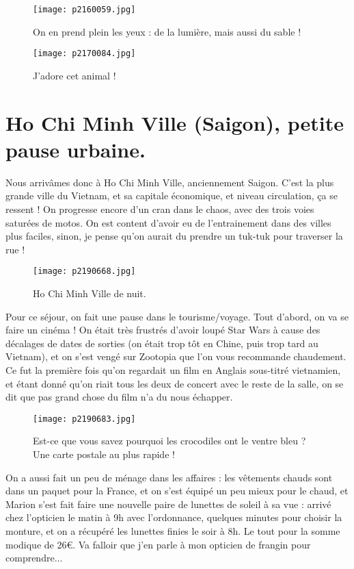 \documentclass{book}
\begin{document}
\begin{figure}[h]
\centering
\texttt{[image: p2160059.jpg]}
\caption*{On en prend plein les yeux : de la lumière, mais aussi du sable !}
\end{figure}


\begin{figure}[h]
\centering
\texttt{[image: p2170084.jpg]}
\caption*{J'adore cet animal !}
\end{figure}



\chapter{Ho Chi Minh Ville (Saigon), petite pause urbaine.}
Nous arrivâmes donc à Ho Chi Minh Ville, anciennement Saigon. C'est la plus grande ville du Vietnam, et sa capitale économique, et niveau circulation, ça se ressent ! On progresse encore d'un cran dans le chaos, avec des trois voies saturées de motos. On est content d'avoir eu de l'entrainement dans des villes plus faciles, sinon, je pense qu'on aurait du prendre un tuk-tuk pour traverser la rue !


\begin{figure}[h]
\centering
\texttt{[image: p2190668.jpg]}
\caption*{Ho Chi Minh Ville de nuit.}
\end{figure}

Pour ce séjour, on fait une pause dans le tourisme/voyage. Tout d'abord, on va se faire un cinéma ! On était très frustrés d'avoir loupé Star Wars à cause des décalages de dates de sorties (on était trop tôt en Chine, puis trop tard au Vietnam), et on s'est vengé sur Zootopia que l'on vous recommande chaudement. Ce fut la première fois qu'on regardait un film en Anglais sous-titré vietnamien, et étant donné qu'on riait tous les deux de concert avec le reste de la salle, on se dit que pas grand chose du film n'a du nous échapper.




\begin{figure}[h]
\centering
\texttt{[image: p2190683.jpg]}
\caption*{Est-ce que vous savez pourquoi les crocodiles ont le ventre bleu ? Une carte postale au plus rapide !}
\end{figure}

On a aussi fait un peu de ménage dans les affaires : les vêtements chauds sont dans un paquet pour la France, et on s'est équipé un peu mieux pour le chaud, et Marion s'est fait faire une nouvelle paire de lunettes de soleil à sa vue : arrivé chez l'opticien le matin à 9h avec l'ordonnance, quelques minutes pour choisir la monture, et on a récupéré les lunettes finies le soir à 8h. Le tout pour la somme modique de 26\euro. Va falloir que j'en parle à mon opticien de frangin pour comprendre...
\end{document}

